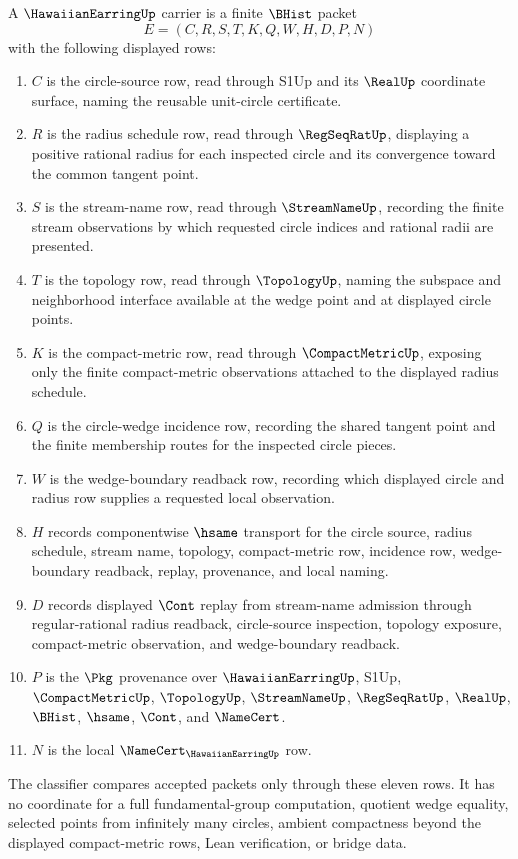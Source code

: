 \begin{definition}
\label{def:hawaiian-earring-carrier}
A $\HawaiianEarringUp$ carrier is a finite $\BHist$ packet
$$
E=(C,R,S,T,K,Q,W,H,D,P,N)
$$
with the following displayed rows:
\begin{enumerate}
\item $C$ is the circle-source row, read through S1Up and its $\RealUp$ coordinate surface, naming the reusable unit-circle certificate.
\item $R$ is the radius schedule row, read through $\RegSeqRatUp$, displaying a positive rational radius for each inspected circle and its convergence toward the common tangent point.
\item $S$ is the stream-name row, read through $\StreamNameUp$, recording the finite stream observations by which requested circle indices and rational radii are presented.
\item $T$ is the topology row, read through $\TopologyUp$, naming the subspace and neighborhood interface available at the wedge point and at displayed circle points.
\item $K$ is the compact-metric row, read through $\CompactMetricUp$, exposing only the finite compact-metric observations attached to the displayed radius schedule.
\item $Q$ is the circle-wedge incidence row, recording the shared tangent point and the finite membership routes for the inspected circle pieces.
\item $W$ is the wedge-boundary readback row, recording which displayed circle and radius row supplies a requested local observation.
\item $H$ records componentwise $\hsame$ transport for the circle source, radius schedule, stream name, topology, compact-metric row, incidence row, wedge-boundary readback, replay, provenance, and local naming.
\item $D$ records displayed $\Cont$ replay from stream-name admission through regular-rational radius readback, circle-source inspection, topology exposure, compact-metric observation, and wedge-boundary readback.
\item $P$ is the $\Pkg$ provenance over $\HawaiianEarringUp$, S1Up, $\CompactMetricUp$, $\TopologyUp$, $\StreamNameUp$, $\RegSeqRatUp$, $\RealUp$, $\BHist$, $\hsame$, $\Cont$, and $\NameCert$.
\item $N$ is the local $\NameCert_{\HawaiianEarringUp}$ row.
\end{enumerate}
The classifier compares accepted packets only through these eleven rows. It has no coordinate for a full fundamental-group computation, quotient wedge equality, selected points from infinitely many circles, ambient compactness beyond the displayed compact-metric rows, Lean verification, or bridge data.
\end{definition}

